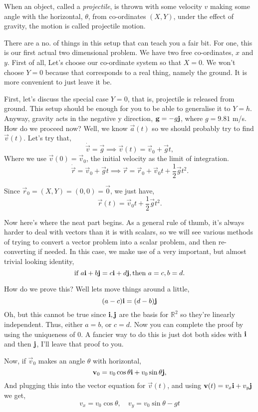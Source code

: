     When an object, called a \textit{projectile}, is thrown with some velocity $v$ 
    making some angle with the horizontal, $\theta$, from co-ordinates $(X, Y)$,
    under the effect of gravity, the motion is called projectile motion.

    There are a no. of things in this setup that can teach you a fair bit. For one,
    this is our first actual two dimensional problem. We have two free co-ordinates,
    $x$ and $y$. First of all, Let's choose our co-ordinate system so that $X = 0$. 
    We won't choose $Y = 0$ because that corresponds to a real thing, namely the ground.
    It is more convenient to just leave it be.

    First, let's discuss the special case $Y = 0$, that is, projectile is released from
    ground. This setup should be enough for you to be able to generalise it to $Y = h$.
    Anyway, gravity acts in the negative y direction, $\mathbf{\boldsymbol{g}} = -g \mathbf{\boldsymbol{j}}$, where $g = 9.81$ m/s. How do we proceed now? Well, we know $\vec{a}(t)$ so we should probably try to find $\vec{v}(t)$. Let's try that,
    $$
    \dot{\vec{v}} = \vec{g} \implies \vec{v}(t) = \vec{v}_0 +\vec{g}t,
    $$
    Where we use $\vec{v}(0) = \vec{v}_0$, the initial velocity as the limit of integration.
    $$
    \dot{\vec{r}} = \vec{v}_0 + \vec{g}t \implies \vec{r} = \vec{r}_0 + \vec{v}_0t + \frac{1}{2} \vec{g}t^2.
    $$
    
    Since $\vec{r}_0 = (X, Y) = (0, 0) = \vec{0}$, we just have,
    $$
    \vec{r}(t) = \vec{v}_0t + \frac{1}{2} \vec{g}t^2.
    $$

    Now here's where the neat part begins. As a general rule of thumb, it's always
    harder to deal with vectors than it is with scalars, so we will see various
    methods of trying to convert a vector problem into a scalar problem, and then
    re-converting if needed. In this case, we make use of a very important, but almost
    trivial looking identity,
    $$\text{if } a\mathbf{\boldsymbol{i}} + b\mathbf{\boldsymbol{j}} = c\mathbf{\boldsymbol{i}} + d\mathbf{\boldsymbol{j}}, \text{then } a = c, b = d.$$

    How do we prove this? Well lets move things around a little, 
    $$
    (a-c)\mathbf{\boldsymbol{i}} = (d-b)\mathbf{\boldsymbol{j}}
    $$
    Oh, but this cannot be true since $\mathbf{\boldsymbol{i}}, \mathbf{\boldsymbol{j}}$ are the basis for $\mathbb{R}^2$ so they're linearly independent. Thus, either $a = b$, or $c = d$. Now you can complete the proof by using the uniqueness of $0$. A fancier way to do this is just 
    dot both sides with $\mathbf{\boldsymbol{i}}$ and then $\mathbf{\boldsymbol{j}}$, I'll leave that proof to you.

    Now, if $\vec{v}_0$ makes an angle $\theta$ with horizontal, 
    $$
    \mathbf{\boldsymbol{v}}_0 = v_0\cos\theta \mathbf{\boldsymbol{i}} + v_0\sin\theta \mathbf{\boldsymbol{j}},
    $$
    And plugging this into the vector equation for $\vec{v}(t)$, and using $\mathbf{\boldsymbol{v}}(t) = v_x \mathbf{\boldsymbol{i}} + v_y \mathbf{\boldsymbol{j}}$ we get,
    \begin{equation}
        v_x = v_0\cos\theta, \quad v_y = v_0\sin\theta - gt        
    \end{equation}    


